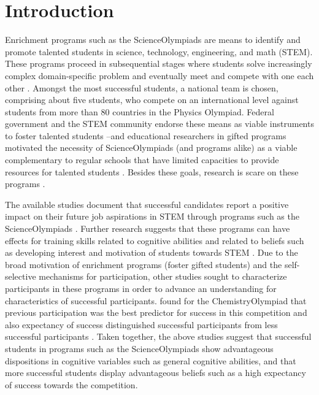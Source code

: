 \documentclass[../main/TaylorFrancis/interactapasample]{subfiles}
\begin{document}
\section{Introduction}

Enrichment programs such as the ScienceOlympiads are means to identify and promote talented students in science, technology, engineering, and math (STEM). These programs proceed in subsequential stages where students solve increasingly complex domain-specific problem and eventually meet and compete with one each other \citep{Petersen.2017}. Amongst the most successful students, a national team is chosen, comprising about five students, who compete on an international level against students from more than 80 countries in the Physics Olympiad. Federal government and the STEM community endorse these means as viable instruments to foster talented students \citep{KMK.2009,Petersen.2017}--and educational researchers in gifted programs motivated the necessity of ScienceOlympiads (and programs alike) as a viable complementary to regular schools that have limited capacities to provide resources for talented students \citep{Reis.2010}. Besides these goals, research is scare on these programs \citep{Ziegler.2004}.

The available studies document that successful candidates report a positive impact on their future job aspirations in STEM through programs such as the ScienceOlympiads \citep{Feng.2001,Oswald.2004,Subotnik.1993}. Further research suggests that these programs can have effects for training skills related to cognitive abilities and related to beliefs such as developing interest and motivation of students towards STEM \citep{Oswald.2004,Aljughaiman.2012,Wai.2010,Marsh.1995}. Due to the broad motivation of enrichment programs (foster gifted students) and the self-selective mechanisms for participation, other studies sought to characterize participants in these programs in order to advance an understanding for characteristics of successful participants. \cite{Urhahne.2012} found for the ChemistryOlympiad that previous participation was the best predictor for success in this competition and also expectancy of success distinguished successful participants from less successful participants \citep[similar findings in:][]{Stang.2014}. Taken together, the above studies suggest that successful students in programs such as the ScienceOlympiads show advantageous dispositions in cognitive variables such as general cognitive abilities, and that more successful students display advantageous beliefs such as a high expectancy of success towards the competition.
\end{document}
